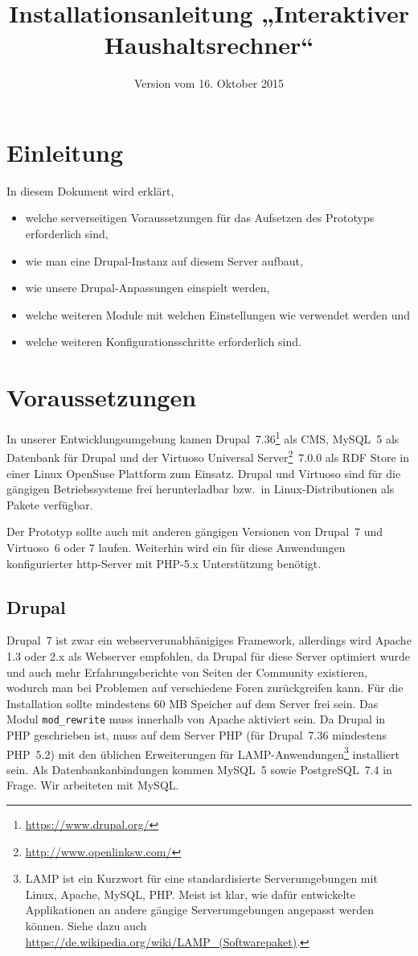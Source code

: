 \documentclass[a4paper,11pt,twoside]{article}
\title{Installationsanleitung „Interaktiver Haushaltsrechner“}
\date{Version vom 16. Oktober 2015}
\begin{document}
\maketitle
\tableofcontents
\newpage
\seitezwei
\newpage

\section{Einleitung}
In diesem Dokument wird erklärt, 
\begin{itemize}\itemsep0pt
\item welche serverseitigen Voraussetzungen für das Aufsetzen des Prototyps
  erforderlich sind, 
\item wie man eine Drupal-Instanz auf diesem Server aufbaut, 
\item wie unsere Drupal-Anpassungen einspielt werden, 
\item welche weiteren Module mit welchen Einstellungen wie verwendet werden und
\item welche weiteren Konfigurationsschritte erforderlich sind.
\end{itemize}

\section{Voraussetzungen}
In unserer Entwicklungsumgebung kamen
Drupal~7.36\footnote{\url{https://www.drupal.org/}} als CMS, MySQL~5 als
Datenbank für Drupal und der Virtuoso Universal
Server\footnote{\url{http://www.openlinksw.com/}}~7.0.0 als RDF Store in einer
Linux OpenSuse Plattform zum Einsatz.  Drupal und Virtuoso sind für die
gängigen Betriebssysteme frei herunterladbar bzw.\ in Linux-Distributionen als
Pakete verfügbar.

Der Prototyp sollte auch mit anderen gängigen Versionen von Drupal~7 und
Virtuoso~6 oder 7 laufen.  Weiterhin wird ein für diese Anwendungen
konfigurierter http-Server mit PHP-5.x Unterstützung benötigt.

\subsection{Drupal}

Drupal~7 ist zwar ein webserverunabhänigiges Framework, allerdings wird Apache
1.3 oder 2.x als Webserver empfohlen, da Drupal für diese Server optimiert
wurde und auch mehr Erfahrungsberichte von Seiten der Community existieren,
wodurch man bei Problemen auf verschiedene Foren zurückgreifen kann. Für die
Installation sollte mindestens 60 MB Speicher auf dem Server frei sein. Das
Modul \texttt{mod\_rewrite} muss innerhalb von Apache aktiviert sein. Da Drupal
in PHP geschrieben ist, muss auf dem Server PHP (für Drupal~7.36 mindestens
PHP~5.2) mit den üblichen Erweiterungen für LAMP-Anwendungen\footnote{LAMP ist
  ein Kurzwort für eine standardisierte Serverumgebungen mit Linux, Apache,
  MySQL, PHP.  Meist ist klar, wie dafür entwickelte Applikationen an andere
  gängige Serverumgebungen angepasst werden können. Siehe dazu auch
  \url{https://de.wikipedia.org/wiki/LAMP_(Softwarepaket)}.}  installiert
sein. Als Datenbankanbindungen kommen MySQL~5 sowie PostgreSQL~7.4 in
Frage. Wir arbeiteten mit MySQL.
\end{document}
